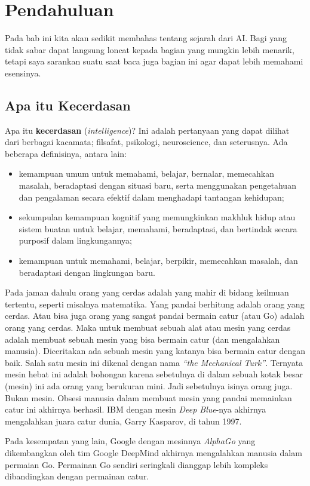 \chapter{Pendahuluan}
Pada bab ini kita akan sedikit membahas tentang sejarah dari AI.
Bagi yang tidak sabar dapat langsung loncat kepada bagian yang
mungkin lebih menarik, tetapi saya sarankan suatu saat baca juga
bagian ini agar dapat lebih memahami esensinya.

\section{Apa itu Kecerdasan}
Apa itu \textbf{kecerdasan} (\emph{intelligence})?
Ini adalah pertanyaan yang dapat dilihat dari berbagai kacamata;
filsafat, psikologi, neuroscience, dan seterusnya.
Ada beberapa definisinya, antara lain:
\begin{itemize}
\item kemampuan umum untuk memahami, belajar, bernalar, memecahkan masalah, 
   beradaptasi dengan situasi baru, serta menggunakan pengetahuan dan 
   pengalaman secara efektif dalam menghadapi tantangan kehidupan;
\item sekumpulan kemampuan kognitif yang memungkinkan makhluk hidup 
   atau sistem buatan untuk belajar, memahami, beradaptasi, dan 
   bertindak secara purposif dalam lingkungannya;
\item kemampuan untuk memahami, belajar, berpikir, memecahkan masalah, 
   dan beradaptasi dengan lingkungan baru.
\end{itemize}

Pada jaman dahulu orang yang cerdas adalah yang mahir di bidang keilmuan
tertentu, seperti misalnya matematika. Yang pandai berhitung adalah
orang yang cerdas.
Atau bisa juga orang yang sangat pandai bermain catur (atau Go) adalah
orang yang cerdas.
Maka untuk membuat sebuah alat atau mesin yang cerdas adalah membuat
sebuah mesin yang bisa bermain catur (dan mengalahkan manusia).
Diceritakan ada sebuah mesin yang katanya bisa bermain catur dengan baik.
Salah satu mesin ini dikenal dengan nama \emph{``the Mechanical Turk''}.
Ternyata mesin hebat ini adalah bohongan karena sebetulnya di dalam
sebuah kotak besar (mesin) ini ada orang yang berukuran mini.
Jadi sebetulnya isinya orang juga. Bukan mesin.
Obsesi manusia dalam membuat mesin yang pandai memainkan catur ini
akhirnya berhasil. IBM dengan mesin \emph{Deep Blue}-nya akhirnya
mengalahkan juara catur dunia, Garry Kasparov, di tahun 1997.

Pada kesempatan yang lain, Google dengan mesinnya \emph{AlphaGo}
yang dikembangkan oleh tim Google DeepMind
akhirnya mengalahkan manusia dalam permaian Go.
Permainan Go sendiri seringkali dianggap lebih kompleks dibandingkan
dengan permainan catur.


